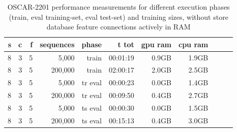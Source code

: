

\begin{table}[H]
\centering
\caption{OSCAR-2201 performance measurements for different execution phases (train, eval training-set, eval test-set) and training sizes, without store database feature connections actively in RAM}
\label{tab:oscar-performance-storeDatabaseInRamFalse}
\begin{tabular}{rrrrrrrrrrr}
\toprule
\textbf{s} & \textbf{c} & \textbf{f} & \textbf{sequences} & \textbf{phase} & \textbf{t tot} & \textbf{gpu ram} & \textbf{cpu ram} \\
\midrule
8 & 3 & 5 & 5,000       & train & 00:01:19 & 0.9GB & 1.9GB \\
8 & 3 & 5 & 200,000     & train & 02:00:17 & 2.0GB & 2.5GB \\
8 & 3 & 5 & 5,000       & tr eval & 00:00:23 & 0.0GB & 1.4GB \\
8 & 3 & 5 & 200,000     & tr eval & 00:09:50 & 0.4GB & 2.7GB \\
8 & 3 & 5 & 5,000       & ts eval & 00:00:30 & 0.0GB & 1.5GB \\
8 & 3 & 5 & 200,000     & ts eval & 00:15:13 & 0.4GB & 3.0GB \\
\bottomrule
\end{tabular}
\end{table}

